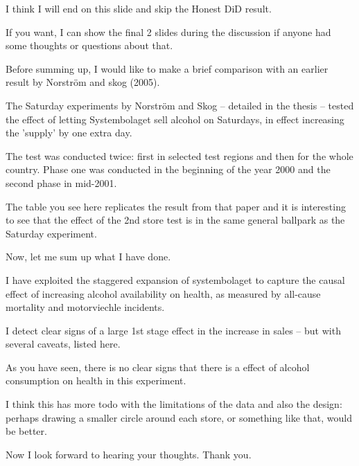 \documentclass[12pt]{article}
\begin{document}
I think I will end on this slide and skip the Honest DiD result. 

If you want, I can show the final 2 slides during the discussion if anyone had some thoughts or questions about that.

Before summing up, I would like to make a brief comparison with an earlier result by Norström and skog (2005). 

The Saturday experiments by Norström and Skog -- detailed in the thesis --  tested the effect of letting Systembolaget sell alcohol on Saturdays, in effect increasing the 'supply' by one extra day. 

The test was conducted twice: first in selected test regions and then for the whole country. Phase one was conducted in the beginning of the year 2000 and the second phase in mid-2001. 

The table you see here replicates the result from that paper and it is interesting to see that the effect of the 2nd store test is in the same general ballpark as the Saturday experiment.

Now, let me sum up what I have done.

I have exploited the staggered expansion of systembolaget to capture the causal effect of increasing alcohol availability on health, as measured by all-cause mortality and motorviechle incidents. 

I detect clear signs of a large 1st stage effect in the increase in sales -- but with several caveats, listed here.

As you have seen, there is no clear signs that there is a effect of alcohol consumption on health in this experiment. 

I think this has more todo with the limitations of the data and also the design: perhaps drawing a smaller circle around each store, or something like that, would be better.

Now I look forward to hearing your thoughts. Thank you.
 
\end{document}
